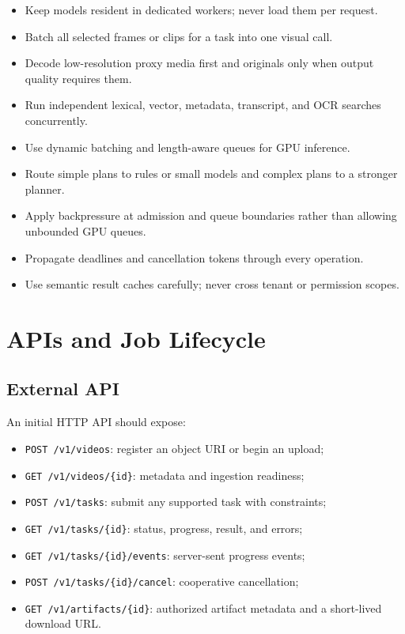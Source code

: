 \documentclass[11pt]{article}
\newcommand{\code}[1]{\texttt{#1}}
\begin{document}
\begin{itemize}
  \item Keep models resident in dedicated workers; never load them per request.
  \item Batch all selected frames or clips for a task into one visual call.
  \item Decode low-resolution proxy media first and originals only when output
  quality requires them.
  \item Run independent lexical, vector, metadata, transcript, and OCR searches
  concurrently.
  \item Use dynamic batching and length-aware queues for GPU inference.
  \item Route simple plans to rules or small models and complex plans to a
  stronger planner.
  \item Apply backpressure at admission and queue boundaries rather than allowing
  unbounded GPU queues.
  \item Propagate deadlines and cancellation tokens through every operation.
  \item Use semantic result caches carefully; never cross tenant or permission
  scopes.
\end{itemize}

\section{APIs and Job Lifecycle}

\subsection{External API}

An initial HTTP API should expose:

\begin{itemize}
  \item \code{POST /v1/videos}: register an object URI or begin an upload;
  \item \code{GET /v1/videos/\{id\}}: metadata and ingestion readiness;
  \item \code{POST /v1/tasks}: submit any supported task with constraints;
  \item \code{GET /v1/tasks/\{id\}}: status, progress, result, and errors;
  \item \code{GET /v1/tasks/\{id\}/events}: server-sent progress events;
  \item \code{POST /v1/tasks/\{id\}/cancel}: cooperative cancellation;
  \item \code{GET /v1/artifacts/\{id\}}: authorized artifact metadata and a
  short-lived download URL.
\end{itemize}
\end{document}

